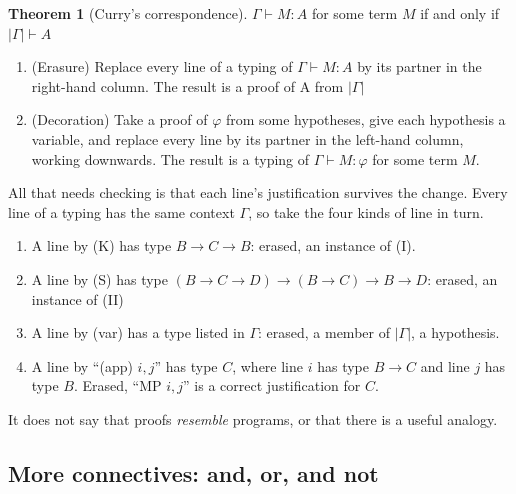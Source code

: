 \documentclass[a4paper, 11pt]{article}
\theoremstyle{definition}
\newtheorem{theorem}[definition]{Theorem}
\begin{document}
\begin{theorem}[Curry's correspondence]
$\Gamma \vdash M:A$ for some term $M$ if  and only if $|\Gamma| \vdash A$

\begin{enumerate}
    \item (Erasure) Replace every line of a typing of $\Gamma \vdash M:A$ by its partner in the right-hand column. The result is a proof of A from $|\Gamma|$
    \item (Decoration) Take a proof of $\varphi$ from some hypotheses, give each hypothesis a variable, and replace every line by its partner in the left-hand column, working downwards. The result is a typing of $\Gamma \vdash M: \varphi$ for some term $M$.
\end{enumerate}
All that needs checking is that each line's justification survives the change. Every line of a typing has the same context $\Gamma$, so take the four kinds of line in turn.
\begin{enumerate}
    \item A line by (K) has type $B \to C \to B$: erased, an instance of (I).
    \item A line by (S) has type $(B \to C \to D) \to (B \to C) \to B \to D$: erased, an instance of (II)
    \item A line by (var) has a type listed in $\Gamma$: erased, a member of $|\Gamma|$, a hypothesis.
    \item A line by ``(app) $i, j$'' has type $C$, where line $i$ has type $B \to C$ and line $j$ has type $B$. Erased, ``MP $i, j$'' is a correct justification for $C$.
\end{enumerate}
It does not say that proofs \textit{resemble} programs, or that there is a useful analogy.
\end{theorem}

\subsection{More connectives: and, or, and not}
\end{document}
